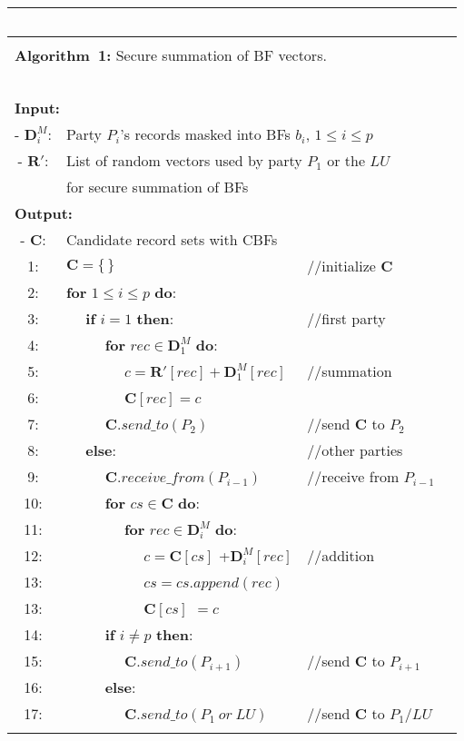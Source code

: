 \documentclass{sig-alternate}
\begin{document}
\begin{itemize}
\begin{table}[!t]
\scriptsize\addtolength{\tabcolsep}{-3pt}
\begin{tabular*}{0.46\textwidth}{c @{\extracolsep{\fill}} lll}
  \label{algo_sec_sim_calc}
    ~ \\[2mm] \hline 
    \\[-2mm]
    \multicolumn{3}{l}{\textbf{Algorithm~1:} Secure summation of BF vectors.}
      \\[0.5mm] \hline
    ~ \\[-3mm]
    \multicolumn{3}{l}{\textbf{Input:}} \\
    {- $\mathbf{D}_i^M$:} & 
      \multicolumn{2}{l}{Party $P_i$'s records masked into BFs $b_i$, $1 \le i \le p$} \\
      {- $\mathbf{R'}$:} & \multicolumn{2}{l}{List of random vectors used by party $P_1$ or the $LU$} \\
      ~ & \multicolumn{2}{l}{for secure summation of BFs} \\
    \multicolumn{3}{l}{\textbf{Output:}} \\
    {- $\mathbf{C}$:} & \multicolumn{2}{l}{Candidate record sets with CBFs} \\[1mm]
    1:&$\mathbf{C} = \{\,\}$ &//initialize $\mathbf{C}$ \\ 
    2:&\textbf{for} $1 \le i \le p$ \textbf{do}: & ~ \\
    3:&~~ \textbf{if} $i = 1$ \textbf{then}:&//first party\\
    4:&~~ ~~ \textbf{for} $rec \in \mathbf{D}_1^M$ \textbf{do}: & ~ \\
    5:&~~ ~~ ~~ $c = \mathbf{R'}[rec] + \mathbf{D}_1^M[rec]$ &//summation \\ 
    6:&~~ ~~ ~~ $\mathbf{C}[rec] = c$ & ~ \\ 
    7:&~~ ~~ $\mathbf{C}.send\_to(P_2)$ &//send $\mathbf{C}$ to $P_2$\\
    8:&~~ \textbf{else}: &//other parties \\
    9:&~~ ~~ $\mathbf{C}.receive\_from(P_{i-1})$ &//receive from $P_{i-1}$\\
    10:&~~ ~~ \textbf{for} $cs \in \mathbf{C}$ \textbf{do}: & ~ \\
    11:&~~ ~~ ~~ \textbf{for} $rec \in \mathbf{D}_i^M$ \textbf{do}: & ~ \\
    12:&~~ ~~ ~~ ~~ $c = \mathbf{C}[cs]$ +$ \mathbf{D}_i^M[rec]$ &//addition \\ 
    13:&~~ ~~ ~~ ~~ $cs = cs.append(rec)$ & \\
    13:&~~ ~~ ~~ ~~ $\mathbf{C}[cs]$ $= c$ & ~ \\ 
    14:&~~ ~~ \textbf{if} $i \neq p$ \textbf{then}: & ~ \\ 
    15:&~~ ~~ ~~ $\mathbf{C}.send\_to(P_{i+1})$ &//send $\mathbf{C}$ to $P_{i+1}$\\ 
    16:&~~ ~~ \textbf{else}: & ~ \\ 
    17:&~~ ~~ ~~ $\mathbf{C}.send\_to(P_{1}~or~LU)$ &//send $\mathbf{C}$ to $P_1$/$LU$\\ [1mm]
      \hline \\ [2mm]
  \end{tabular*}
\end{table}


\end{itemize}
\end{document}
